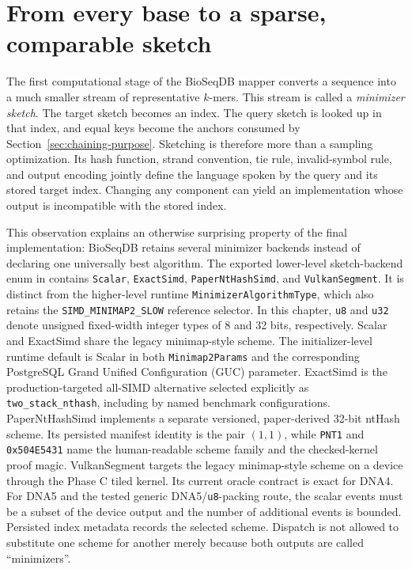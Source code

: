 \section{From every base to a sparse, comparable sketch}
\label{sec:minimizers-role}

The first computational stage of the BioSeqDB mapper converts a sequence into a
much smaller stream of representative $k$-mers.  This stream is called a
\emph{minimizer sketch}. The target sketch becomes an index. The query sketch
is looked up in that index, and equal keys become the anchors consumed by
Section~\ref{sec:chaining-purpose}. Sketching is therefore more than a sampling
optimization. Its hash
function, strand convention, tie rule, invalid-symbol rule, and output encoding
jointly define the language spoken by the query and its stored target index.
Changing any component can yield an implementation whose output is
incompatible with the stored index.

This observation explains an otherwise surprising property of the final
implementation: BioSeqDB retains several minimizer backends instead of
declaring one universally best algorithm.  The exported lower-level
sketch-backend enum in
 contains
\texttt{Scalar}, \texttt{ExactSimd}, \texttt{PaperNtHashSimd}, and
\texttt{VulkanSegment}.  It is distinct from the higher-level runtime
\texttt{MinimizerAlgorithmType}, which also retains the
\texttt{SIMD\_MINIMAP2\_SLOW} reference selector. In this chapter,
\texttt{u8} and \texttt{u32} denote unsigned fixed-width integer types of
8 and 32 bits, respectively. Scalar and ExactSimd share the legacy
minimap-style scheme. The
initializer-level runtime default is Scalar in both
\texttt{Minimap2Params} and the corresponding PostgreSQL Grand Unified
Configuration (GUC) parameter. ExactSimd is the
production-targeted all-SIMD alternative selected explicitly as
\texttt{two\_stack\_nthash}, including by named benchmark configurations.
PaperNtHashSimd implements a separate versioned, paper-derived 32-bit ntHash
scheme. Its persisted manifest identity is the pair $(1,1)$, while
\texttt{PNT1} and \texttt{0x504E5431} name the human-readable scheme family
and the checked-kernel proof magic. VulkanSegment targets the legacy
minimap-style scheme on a device through the Phase C tiled kernel. Its current
oracle contract is exact for DNA4. For DNA5 and the tested generic
DNA5/\texttt{u8}-packing route, the scalar events must be a subset of the
device output and the number of additional events is bounded. Persisted index
metadata records the selected scheme. Dispatch is not allowed to substitute
one scheme for another merely because both outputs are called ``minimizers''.


